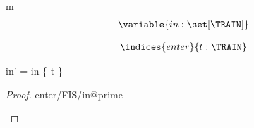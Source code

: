 \begin{machine}{m}
\newset{\TRAIN}
\begin{align*}
\variable{	in : \set[\TRAIN]}
\end{align*}



\begin{align*}
\indices{enter}{	t: \TRAIN}
\end{align*}

\begin{banana}
{	in' = in \bunion \{ t \} }
\end{banana}
\begin{proof}{enter/FIS/in@prime}
	\begin{calculation}
		\true
	\hint{=}{  }
		\true
	\end{calculation}
\end{proof}
\end{machine}